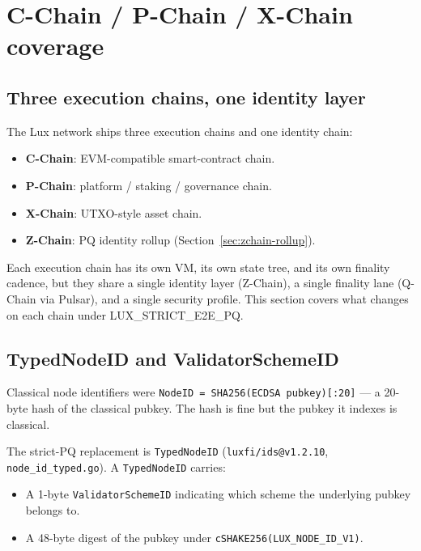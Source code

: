 \section{C-Chain / P-Chain / X-Chain coverage}
\label{sec:cpx-coverage}

\subsection{Three execution chains, one identity layer}

The Lux network ships three execution chains and one identity chain:

\begin{itemize}[leftmargin=2em,nosep]
  \item \textbf{C-Chain}: EVM-compatible smart-contract chain.
  \item \textbf{P-Chain}: platform / staking / governance chain.
  \item \textbf{X-Chain}: UTXO-style asset chain.
  \item \textbf{Z-Chain}: PQ identity rollup
    (Section~\ref{sec:zchain-rollup}).
\end{itemize}

Each execution chain has its own VM, its own state tree, and its own
finality cadence, but they share a single identity layer (Z-Chain), a
single finality lane (Q-Chain via Pulsar), and a single security
profile. This section covers what changes on each chain under
LUX\_STRICT\_E2E\_PQ.

\subsection{TypedNodeID and ValidatorSchemeID}

Classical node identifiers were
\texttt{NodeID = SHA256(ECDSA pubkey)[:20]} --- a 20-byte hash of the
classical pubkey. The hash is fine but the pubkey it indexes is classical.

The strict-PQ replacement is \texttt{TypedNodeID}
(\texttt{luxfi/ids@v1.2.10}, \texttt{node\_id\_typed.go}). A
\texttt{TypedNodeID} carries:

\begin{itemize}[leftmargin=2em,nosep]
  \item A 1-byte \texttt{ValidatorSchemeID} indicating which scheme the
    underlying pubkey belongs to.
  \item A 48-byte digest of the pubkey under
    \texttt{cSHAKE256(LUX\_NODE\_ID\_V1)}.
\end{itemize}

